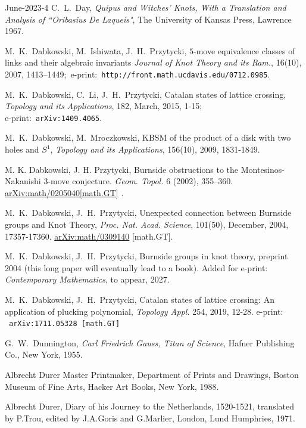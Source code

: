 \documentclass[12pt]{amsart}
\begin{document}
\begin{thebibliography}{June-2023-4}
C.~L.~Day,  {\it  Quipus and Witches' Knots,  With a Translation and Analysis
of ``Oribasius De Laqueis"},   The University of Kansas Press, Lawrence 1967.

M.~K.~Dabkowski, M.~Ishiwata, J.~H.~Przytycki,
$5$-move equivalence classes of links and their algebraic invariants
{\it Journal of Knot Theory and its Ram.}, 16(10), 2007, 1413--1449;\ 
e-print:\ {\tt http://front.math.ucdavis.edu/0712.0985}.

  M.~K.~Dabkowski, C.~Li, J.~H.~Przytycki,
Catalan states of lattice crossing, {\it  Topology and its Applications},
182, March, 2015, 1-15;\\
e-print:\  {\tt arXiv:1409.4065}.

M.~K.~Dabkowski, M.~Mroczkowski,
KBSM of the product of a disk with two holes and $S^{1}$,
{\it Topology and its Applications},
156(10), 2009, 1831-1849.

M. K. Dabkowski, J. H. Przytycki, Burnside obstructions to the Montesinos-Nakanishi 3-move conjecture. {\it Geom. Topol.} 6 (2002), 355–360. \href{https://arxiv.org/abs/math/0205040}{arXiv:math/0205040[math.GT]} .

M.~K.~Dabkowski, J.~H.~Przytycki,
Unexpected connection between Burnside groups and Knot Theory,
{\it Proc. Nat. Acad. Science},
101(50), December, 2004, 17357-17360. 
\href{https://arxiv.org/abs/math/0309140}{arXiv:math/0309140} [math.GT].

M.~K.~Dabkowski, J.~H.~Przytycki, Burnside groups in knot theory, preprint 2004 (this long paper will eventually lead to a book).
{\color{red} Added for e-print: {\it Contemporary Mathematics}, to appear, 2027.}

M.~K.~Dabkowski, J.~H.~Przytycki, 
Catalan states of lattice crossing: An application of plucking polynomial, {\it Topology Appl.} 254, 2019, 12-28.
e-print: \ {\tt arXiv:1711.05328 [math.GT] }

G.~W.~Dunnington,  {\it Carl Friedrich Gauss,  Titan of Science},
Hafner Publishing Co.,   New York,  1955.

Albrecht Durer Master Printmaker, Department of Prints and Drawings,
Boston Museum of Fine Arts, Hacker Art Books, New York, 1988.

Albrecht Durer, Diary of his Journey to the Netherlands, 1520-1521,
translated by P.Trou, edited by J.A.Goris and G.Marlier, London,
Lund Humphries, 1971.


\end{thebibliography}
\end{document}
